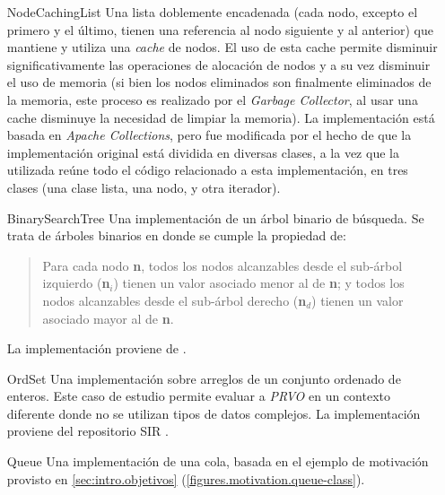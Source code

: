 \begin{enumerate}[leftmargin=.75cm,align=left,style=nextline]
	\item[NodeCachingList] Una lista doblemente encadenada (cada nodo, excepto el primero y el \'ultimo, tienen una referencia al nodo siguiente y al anterior) que mantiene y utiliza una \emph{cache} de nodos. El uso de esta cache permite disminuir significativamente las operaciones de alocaci\'on de nodos y a su vez disminuir el uso de memoria (si bien los nodos eliminados son finalmente eliminados de la memoria, este proceso es realizado por el \emph{Garbage Collector}, al usar una cache disminuye la necesidad de limpiar la memoria). La implementaci\'on est\'a basada en \emph{Apache Collections}, pero fue modificada por el hecho de que la implementaci\'on original est\'a dividida en diversas clases, a la vez que la utilizada re\'une todo el c\'odigo relacionado a esta implementaci\'on, en tres clases (una clase lista, una nodo, y otra iterador).
	
	\item[BinarySearchTree] Una implementaci\'on de un \'arbol binario de b\'usqueda. Se trata de \'arboles binarios en donde se cumple la propiedad de:
	\begin{quote}
		Para cada nodo \textbf{n}, todos los nodos alcanzables desde el sub-\'arbol izquierdo (\textbf{n$_i$}) tienen un valor asociado menor al de \textbf{n}; y todos los nodos alcanzables desde el sub-\'arbol derecho (\textbf{n$_d$}) tienen un valor asociado mayor al de \textbf{n}.
	\end{quote}
	La implementaci\'on proviene de \cite{bibliography.mutation.tools.TACOGaleottiRPF13}.
	
	\item[OrdSet] Una implementaci\'on sobre arreglos de un conjunto ordenado de enteros. Este caso de estudio permite evaluar a \emph{PRVO} en un contexto diferente donde no se utilizan tipos de datos complejos. La implementaci\'on proviene del repositorio SIR \cite{bibliography.testing.SIRDoER05}.
	
	\item[Queue] Una implementaci\'on de una cola, basada en el ejemplo de motivaci\'on provisto en \ref{sec:intro.objetivos} (\ref{figures.motivation.queue-class}).
	
	
\end{enumerate}

